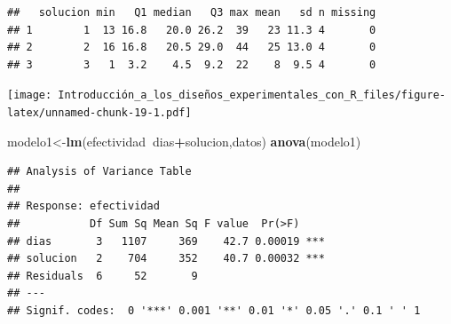 \documentclass[]{book}
\newenvironment{Shaded}{\begin{snugshade}}{\end{snugshade}}
\newcommand{\KeywordTok}[1]{\textcolor[rgb]{0.13,0.29,0.53}{\textbf{#1}}}
\newcommand{\DataTypeTok}[1]{\textcolor[rgb]{0.13,0.29,0.53}{#1}}
\newcommand{\StringTok}[1]{\textcolor[rgb]{0.31,0.60,0.02}{#1}}
\newcommand{\OperatorTok}[1]{\textcolor[rgb]{0.81,0.36,0.00}{\textbf{#1}}}
\newcommand{\NormalTok}[1]{#1}
\begin{document}
\begin{Shaded}
\end{Shaded}

\begin{verbatim}
##   solucion min   Q1 median   Q3 max mean   sd n missing
## 1        1  13 16.8   20.0 26.2  39   23 11.3 4       0
## 2        2  16 16.8   20.5 29.0  44   25 13.0 4       0
## 3        3   1  3.2    4.5  9.2  22    8  9.5 4       0
\end{verbatim}

\begin{Shaded}
\end{Shaded}

\texttt{[image: Introducción\_a\_los\_diseños\_experimentales\_con\_R\_files/figure-latex/unnamed-chunk-19-1.pdf]}

\begin{Shaded}
\begin{Highlighting}[]
\NormalTok{modelo1<-}\KeywordTok{lm}\NormalTok{(efectividad}\OperatorTok{~}\NormalTok{dias}\OperatorTok{+}\NormalTok{solucion,datos)}
\KeywordTok{anova}\NormalTok{(modelo1)}
\end{Highlighting}
\end{Shaded}

\begin{verbatim}
## Analysis of Variance Table
## 
## Response: efectividad
##           Df Sum Sq Mean Sq F value  Pr(>F)    
## dias       3   1107     369    42.7 0.00019 ***
## solucion   2    704     352    40.7 0.00032 ***
## Residuals  6     52       9                    
## ---
## Signif. codes:  0 '***' 0.001 '**' 0.01 '*' 0.05 '.' 0.1 ' ' 1
\end{verbatim}
\end{document}
